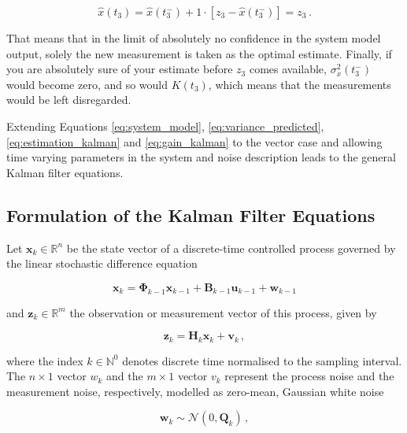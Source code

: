\begin{equation}\label{eq:prediction_kalman}
  \hat{x}(t_3) = \hat{x}(t^-_3) + 1 \cdot [z_3-\hat{x}(t^-_3)] = z_3\,.
\end{equation}

\noindent
That means that in the limit of absolutely no confidence in the system model output, solely the new measurement is taken as the optimal estimate. Finally, if you are absolutely sure of your estimate before $z_3$ comes available, $\sigma^2_x(t^-_3)$ would become zero, and so would $K(t_3)$, which means that the measurements would be left disregarded. 

Extending Equations \ref{eq:system_model}, \ref{eq:variance_predicted}, \ref{eq:estimation_kalman} and \ref{eq:gain_kalman} to the vector case and allowing time varying parameters in the system and noise description leads to the general Kalman filter equations.

\subsection{Formulation of the Kalman Filter Equations}

Let $\mathbf{x}_k \in \mathbb{R}^n$ be the state vector of a discrete-time controlled process governed by the linear stochastic difference equation 

\begin{equation}\label{eq:time_dynamical_system_plant}
  \mathbf{x}_k = \mathbf{\Phi}_{k-1}\mathbf{x}_{k-1}+\mathbf{B}_{k-1}\mathbf{u}_{k-1}+\mathbf{w}_{k-1}
\end{equation}

\noindent
and $\mathbf{z}_k \in \mathbb{R}^m$ the observation or measurement vector of this process, given by

\begin{equation}\label{eq:time_dynamical_system_measurement}
  \mathbf{z}_k = \mathbf{H}_{k}\mathbf{x}_{k}+\mathbf{v}_{k}\,,
\end{equation}

\noindent
where the index $k \in \mathbb{N}^0$ denotes discrete time normalised to the sampling interval. The $n\times1$ vector $w_k$ and the $m\times1$ vector $v_k$ represent the process noise and the measurement noise, respectively, modelled as zero-mean, Gaussian white noise

\begin{equation}\label{eq:process_noise}
  \mathbf{w}_{k} \sim \mathcal{N}(0,\mathbf{Q}_k)\,,
\end{equation}

